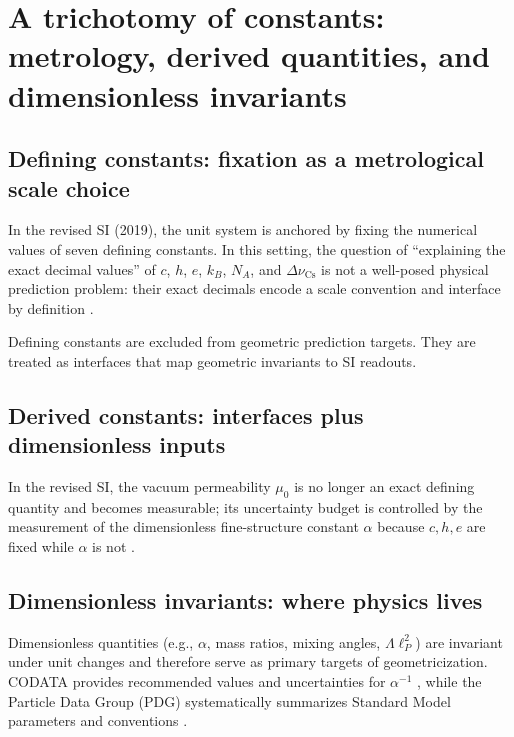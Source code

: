 \section{A trichotomy of constants: metrology, derived quantities, and dimensionless invariants}
\label{sec:trichotomy}

\subsection{Defining constants: fixation as a metrological scale choice}
In the revised SI (2019), the unit system is anchored by fixing the numerical values of seven defining constants. In this setting, the question of ``explaining the exact decimal values'' of $c$, $h$, $e$, $k_B$, $N_A$, and $\Delta\nu_{\mathrm{Cs}}$ is not a well-posed physical prediction problem: their exact decimals encode a scale convention and interface by definition \cite{BIPMSI2019}.

\begin{remark}
\label{rem:writing_discipline}
Defining constants are excluded from geometric prediction targets. They are treated as interfaces that map geometric invariants to SI readouts.
\end{remark}

\subsection{Derived constants: interfaces plus dimensionless inputs}
In the revised SI, the vacuum permeability $\mu_0$ is no longer an exact defining quantity and becomes measurable; its uncertainty budget is controlled by the measurement of the dimensionless fine-structure constant $\alpha$ because $c,h,e$ are fixed while $\alpha$ is not \cite{NISTMu0RevisedSI,CODATA2022RMP}.

\subsection{Dimensionless invariants: where physics lives}
Dimensionless quantities (e.g., $\alpha$, mass ratios, mixing angles, $\Lambda \ell_P^2$) are invariant under unit changes and therefore serve as primary targets of geometricization. CODATA provides recommended values and uncertainties for $\alpha^{-1}$ \cite{CODATA2022RMP}, while the Particle Data Group (PDG) systematically summarizes Standard Model parameters and conventions \cite{PDGRPP2024}.
